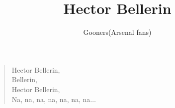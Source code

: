 \documentclass[a4paper,12pt]{article}
\title{Hector Bellerin}
\author{Gooners(Arsenal fans)}
\date{}
\begin{document}
	
	\maketitle
	
	\begin{verse}
		
		Hector Bellerin, \\
		Bellerin, \\
		Hector Bellerin, \\
		Na, na, na, na, na, na, na$\ldots$
		
	\end{verse}
	
\end{document}
